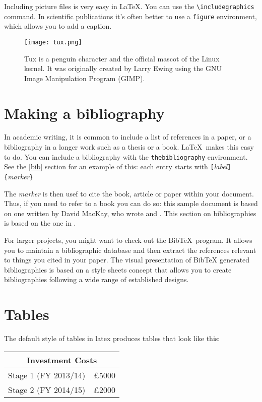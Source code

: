 \documentclass[12pt]{article}
\begin{document}
Including picture files is very easy in \LaTeX .  You can use the \verb+\includegraphics+ command.  In scientific publications it's often better to use a \verb+figure+ environment, which allows you to add a caption.

\begin{figure}[h]
\begin{center}
\texttt{[image: tux.png]}
\end{center}
\caption{Tux is a penguin character and the official mascot of the Linux kernel.  It was originally created by Larry Ewing using the GNU Image Manipulation Program (GIMP).}
\label{fig1}
\end{figure}

\section{Making a bibliography}

In academic writing, it is common to include a list of references in a paper, or a bibliography in a longer work such as a thesis or a book.  \LaTeX\ makes this easy to do.  You can include a bibliography with the \verb+thebibliography+ environment.  See the \ref{bib} section for an example of this: each entry starts with 
\verb|[|\emph{label}\verb|]{|\emph{marker}\verb|}|

The \emph{marker} is then usef to cite the book, article or paper within your document.  Thus, if you need to refer to a book you can do so: this sample document is based on one written by David MacKay, who wrote \cite{sewtha} and \cite{itila}.  This section on bibliographies is based on the one in \cite{lshort}.

For larger projects, you might want to check out the Bib\TeX\ program.  It allows you to maintain a bibliographic database and then extract the references relevant to things you cited in your paper. The visual presentation of Bib\TeX{} generated bibliographies is based on a style sheets concept that allows you to create bibliographies following a wide range of established designs.

\section{Tables}
The default style of tables in latex produces tables that look like this:
\begin{center}
\begin{tabular}{|l|r|} \hline \hline 
 \multicolumn{2}{|c|}{ {\sc Investment Costs} } \\ \hline
 Stage 1 (FY 2013/14)   & \pounds 5000 \\
 Stage 2 (FY 2014/15)	& \pounds 2000 \\ \hline  \hline
\end{tabular}
\end{center}
\end{document}
